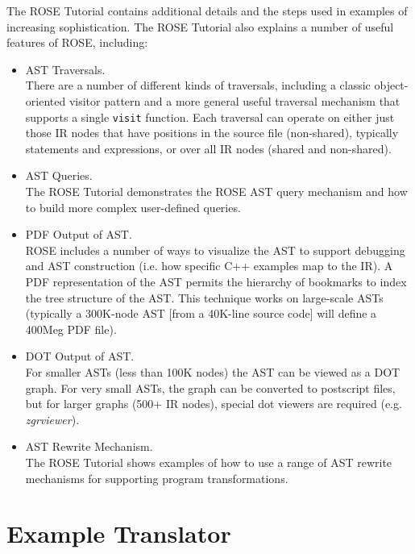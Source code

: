     The ROSE Tutorial contains additional details and the steps used in  
examples of increasing sophistication. The ROSE Tutorial also explains
a number of useful features of ROSE, including:
\begin{itemize}
   \item AST Traversals. \\
         There are a number of different kinds of traversals, including a classic
         object-oriented visitor pattern and a more general useful traversal 
         mechanism that supports a single {\tt visit} function.  Each traversal
         can operate on either just those IR nodes that have positions in the 
         source file (non-shared), typically statements and expressions, or 
         over all IR nodes (shared and non-shared).
   \item AST Queries. \\ 
         The ROSE Tutorial demonstrates the ROSE AST query mechanism and how to build more
         complex user-defined queries.
   \item PDF Output of AST. \\
         ROSE includes a number of ways to visualize the AST to support debugging and
         AST construction (i.e. how specific C++ examples map to the IR).  A PDF 
         representation of the AST permits the hierarchy of bookmarks to index the tree
         structure of the AST.  This technique works on large-scale ASTs (typically
         a 300K-node AST [from a 40K-line source code] will define a 400Meg PDF file).
   \item DOT Output of AST. \\
         For smaller ASTs (less than 100K nodes) the AST can be viewed as a DOT graph.
         For very small ASTs, the graph can be converted to postscript files, but for
         larger graphs (500+ IR nodes), special dot viewers are required (e.g. {\em zgrviewer}).
   \item AST Rewrite Mechanism. \\
         The ROSE Tutorial shows examples of how to use a range of AST rewrite
         mechanisms for supporting program transformations.
\end{itemize}


\section{Example Translator}

